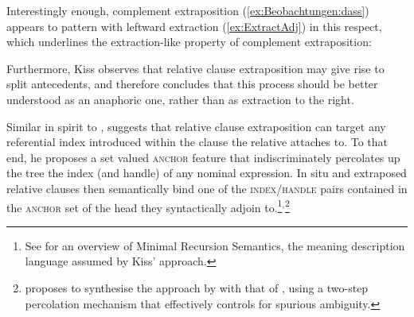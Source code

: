 \documentclass[output=paper
,notxmath 
 	        ,biblatex
                ,babelshorthands
                ,newtxmath
                ,draftmode
                ,colorlinks, citecolor=brown
]{langscibook}
\begin{document}
Interestingly enough, complement extraposition (\ref{ex:Beobachtungen:dass}) appears to pattern with
leftward extraction (\ref{ex:ExtractAdj}) in this respect, which underlines the
extraction-like property of complement extraposition:

\z

Furthermore, Kiss observes that relative clause extraposition may give
rise to split antecedents, and therefore concludes that this process
should be better understood as an anaphoric one, rather than as
extraction to the right. 

Similar in spirit to \citet{culicover90:_extrap_and_compl_princ},
\citet{kiss_t02nllt} suggests that relative clause extraposition can
target any referential index introduced within the clause the relative
attaches to.  To that end, he proposes a set valued \textsc{anchor}
feature that indiscriminately percolates up the tree the index (and
handle) of any nominal expression. In situ and extraposed relative
clauses then semantically bind one of the \textsc{index/handle} pairs
contained in the \textsc{anchor} set of the head they syntactically
adjoin to.\footnote{See
  for an overview of Minimal Recursion Semantics, the meaning
  description language assumed by Kiss'
  approach.}$^,$\footnote{\citet{crysmann_b04rlc} proposes to
  synthesise the approach by \citet{kiss_t02nllt} with that of
  \citet{Keller:95}, using a two-step percolation mechanism that
  effectively controls for spurious ambiguity.}
\end{document}
